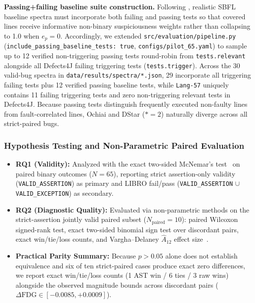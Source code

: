 \documentclass[12pt, a4paper]{article}
\begin{document}
\textbf{Passing+failing baseline suite construction.}
Following \citet{an2022fdg}, realistic SBFL baseline spectra must incorporate both failing and passing tests so that covered lines receive informative non-binary suspiciousness weights rather than collapsing to 1.0 when $e_p = 0$.
Accordingly, we extended \texttt{src/evaluation/pipeline.py} (\texttt{include\_passing\_baseline\_tests: true}, \texttt{configs/pilot\_65.yaml}) to sample up to 12 verified non-triggering passing tests round-robin from \texttt{tests.relevant} alongside all Defects4J failing triggering tests (\texttt{tests.trigger}).
Across the 30 valid-bug spectra in \texttt{data/results/spectra/*.json}, 29 incorporate all triggering failing tests plus 12 verified passing baseline tests, while \texttt{Lang-57} uniquely contains 11 failing triggering tests and zero non-triggering relevant tests in Defects4J.
Because passing tests distinguish frequently executed non-faulty lines from fault-correlated lines, Ochiai and DStar ($*=2$) naturally diverge across all strict-paired bugs.

\subsubsection{Hypothesis Testing and Non-Parametric Paired Evaluation}

\begin{itemize}[leftmargin=*]
  \item \textbf{RQ1 (Validity):} Analyzed with the exact two-sided McNemar's test~\citep{mcnemar1947note} on paired binary outcomes ($N=65$), reporting strict assertion-only validity (\texttt{VALID\_ASSERTION}) as primary and LIBRO fail/pass (\texttt{VALID\_ASSERTION} $\cup$ \texttt{VALID\_EXCEPTION}) as secondary.
  \item \textbf{RQ2 (Diagnostic Quality):} Evaluated via non-parametric methods on the strict-assertion jointly valid paired subset ($N_{\text{paired}} = 10$): paired Wilcoxon signed-rank test, exact two-sided binomial sign test over discordant pairs, exact win/tie/loss counts, and Vargha--Delaney $\hat{A}_{12}$ effect size~\citep{vargha2000a12}.
  \item \textbf{Practical Parity Summary:} Because $p > 0.05$ alone does not establish equivalence and six of ten strict-paired cases produce exact zero differences, we report exact win/tie/loss counts (1 AST win / 6 ties / 3 raw wins) alongside the observed magnitude bounds across discordant pairs ($\Delta\text{FDG} \in [-0.0085, +0.0009]$).
\end{itemize}
\end{document}
